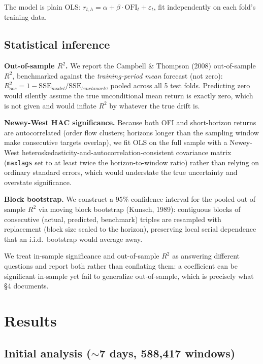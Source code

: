 \documentclass[11pt]{article}
\begin{document}
The model is plain OLS: $r_{t,h} = \alpha + \beta \cdot \text{OFI}_t + \varepsilon_t$, fit independently on each fold's training data.

\subsection{Statistical inference}

\textbf{Out-of-sample $R^2$.} We report the Campbell \& Thompson (2008) out-of-sample $R^2$, benchmarked against the \emph{training-period mean} forecast (not zero): $R^2_{oos} = 1 - \text{SSE}_{model} / \text{SSE}_{benchmark}$, pooled across all 5 test folds. Predicting zero would silently assume the true unconditional mean return is exactly zero, which is not given and would inflate $R^2$ by whatever the true drift is.

\textbf{Newey-West HAC significance.} Because both OFI and short-horizon returns are autocorrelated (order flow clusters; horizons longer than the sampling window make consecutive targets overlap), we fit OLS on the full sample with a Newey-West heteroskedasticity-and-autocorrelation-consistent covariance matrix (\texttt{maxlags} set to at least twice the horizon-to-window ratio) rather than relying on ordinary standard errors, which would understate the true uncertainty and overstate significance.

\textbf{Block bootstrap.} We construct a 95\% confidence interval for the pooled out-of-sample $R^2$ via moving block bootstrap (Kunsch, 1989): contiguous blocks of consecutive (actual, predicted, benchmark) triples are resampled with replacement (block size scaled to the horizon), preserving local serial dependence that an i.i.d.\ bootstrap would average away.

We treat in-sample significance and out-of-sample $R^2$ as answering different questions and report both rather than conflating them: a coefficient can be significant in-sample yet fail to generalize out-of-sample, which is precisely what \S4 documents.

\section{Results}

\subsection{Initial analysis ($\sim$7 days, 588{,}417 windows)}
\end{document}
